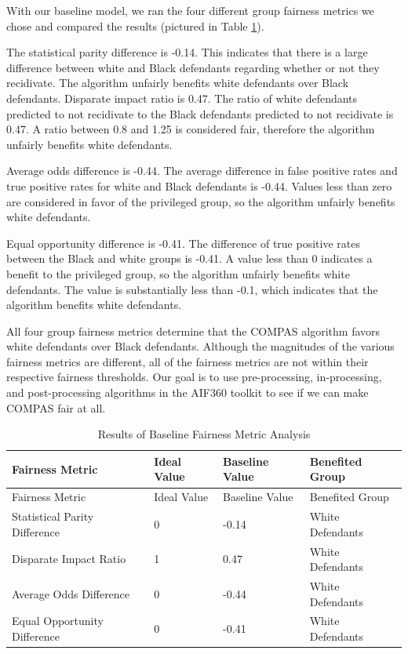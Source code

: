 \documentclass[water,article,submit,moreauthors,pdftex]{mdpi}
\begin{document}
With our baseline model, we ran the four different group fairness
metrics we chose and compared the results (pictured in Table
\ref{tab:baseline metrics table}).

The statistical parity difference is -0.14. This indicates that there is
a large difference between white and Black defendants regarding whether
or not they recidivate. The algorithm unfairly benefits white defendants
over Black defendants. Disparate impact ratio is 0.47. The ratio of
white defendants predicted to not recidivate to the Black defendants
predicted to not recidivate is 0.47. A ratio between 0.8 and 1.25 is
considered fair, therefore the algorithm unfairly benefits white
defendants.

Average odds difference is -0.44. The average difference in false
positive rates and true positive rates for white and Black defendants is
-0.44. Values less than zero are considered in favor of the privileged
group, so the algorithm unfairly benefits white defendants.

Equal opportunity difference is -0.41. The difference of true positive
rates between the Black and white groups is -0.41. A value less than 0
indicates a benefit to the privileged group, so the algorithm unfairly
benefits white defendants. The value is substantially less than -0.1,
which indicates that the algorithm benefits white defendants.

All four group fairness metrics determine that the COMPAS algorithm
favors white defendants over Black defendants. Although the magnitudes
of the various fairness metrics are different, all of the fairness
metrics are not within their respective fairness thresholds. Our goal is
to use pre-processing, in-processing, and post-processing algorithms in
the AIF360 toolkit to see if we can make COMPAS fair at all.

\begin{longtable}[]{@{}llll@{}}
\caption{Results of Baseline Fairness Metric Analysis
\label{tab:baseline metrics table}}\tabularnewline
\toprule
Fairness Metric & Ideal Value & Baseline Value & Benefited
Group\tabularnewline
\midrule
\endfirsthead
\toprule
Fairness Metric & Ideal Value & Baseline Value & Benefited
Group\tabularnewline
\midrule
\endhead
Statistical Parity Difference & 0 & -0.14 & White
Defendants\tabularnewline
Disparate Impact Ratio & 1 & 0.47 & White Defendants\tabularnewline
Average Odds Difference & 0 & -0.44 & White Defendants\tabularnewline
Equal Opportunity Difference & 0 & -0.41 & White
Defendants\tabularnewline
\bottomrule
\end{longtable}
\end{document}
